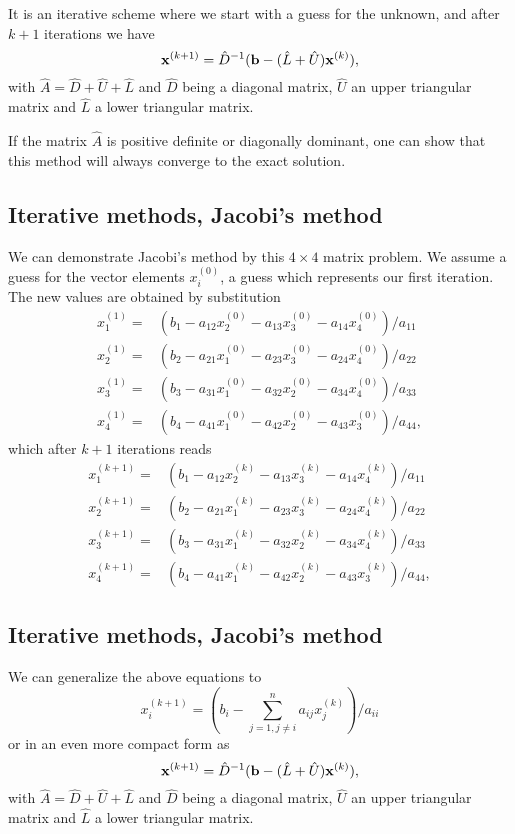 \documentclass[%
twoside,                 %
final,                   %
10pt]{article}
\begin{document}
{{{{{{{\begin{block}{}
It is an iterative scheme where we start with a guess for the unknown, and 
after $k+1$ iterations we have  
\[ 
{\bf x}^{(k+1)}= \hat{D}^{-1}({\bf b}-(\hat{L}+\hat{U}){\bf x}^{(k)}),
\]
with $\hat{A}=\hat{D}+\hat{U}+\hat{L}$ and
$\hat{D}$ being a diagonal matrix, $\hat{U}$ an upper triangular matrix and $\hat{L}$ a  lower triangular
matrix.

If the matrix $\hat{A}$ is positive definite or diagonally dominant, one can show that this method will always converge to the exact solution. 
\end{block}


\subsection{Iterative methods, Jacobi's method}
\begin{block}{}
We can demonstrate Jacobi's method by this $4\times 4$ matrix problem. We assume a guess
for the vector elements $x_i^{(0)}$, a guess which represents our first iteration. The new
values are obtained by substitution
\begin{eqnarray}
 x_1^{(1)} =&(b_1-a_{12}x_2^{(0)} -a_{13}x_3^{(0)} - a_{14}x_4^{(0)})/a_{11} \nonumber \\
 x_2^{(1)} =&(b_2-a_{21}x_1^{(0)} - a_{23}x_3^{(0)} - a_{24}x_4^{(0)})/a_{22} \nonumber \\
 x_3^{(1)} =&(b_3- a_{31}x_1^{(0)} -a_{32}x_2^{(0)} -a_{34}x_4^{(0)})/a_{33} \nonumber \\
 x_4^{(1)}=&(b_4-a_{41}x_1^{(0)} -a_{42}x_2^{(0)} - a_{43}x_3^{(0)})/a_{44},  \nonumber
\end{eqnarray}
which after $k+1$ iterations reads
\begin{eqnarray}
 x_1^{(k+1)} =&(b_1-a_{12}x_2^{(k)} -a_{13}x_3^{(k)} - a_{14}x_4^{(k)})/a_{11} \nonumber \\
 x_2^{(k+1)} =&(b_2-a_{21}x_1^{(k)} - a_{23}x_3^{(k)} - a_{24}x_4^{(k)})/a_{22} \nonumber \\
 x_3^{(k+1)} =&(b_3- a_{31}x_1^{(k)} -a_{32}x_2^{(k)} -a_{34}x_4^{(k)})/a_{33} \nonumber \\
 x_4^{(k+1)}=&(b_4-a_{41}x_1^{(k)} -a_{42}x_2^{(k)} - a_{43}x_3^{(k)})/a_{44},  \nonumber
\end{eqnarray}
\end{block}


\subsection{Iterative methods, Jacobi's method}
\begin{block}{}
We can generalize the above equations to
\[
 x_i^{(k+1)}=(b_i-\sum_{j=1, j\ne i}^{n}a_{ij}x_j^{(k)})/a_{ii}
\]
or in an even more compact form as
\[ {\bf x}^{(k+1)}= \hat{D}^{-1}({\bf b}-(\hat{L}+\hat{U}){\bf x}^{(k)}),
\]
with $\hat{A}=\hat{D}+\hat{U}+\hat{L}$ and
$\hat{D}$ being a diagonal matrix, $\hat{U}$ an upper triangular matrix and $\hat{L}$ a  lower triangular
matrix.
\end{block}

}}}}}}}
\end{document}
